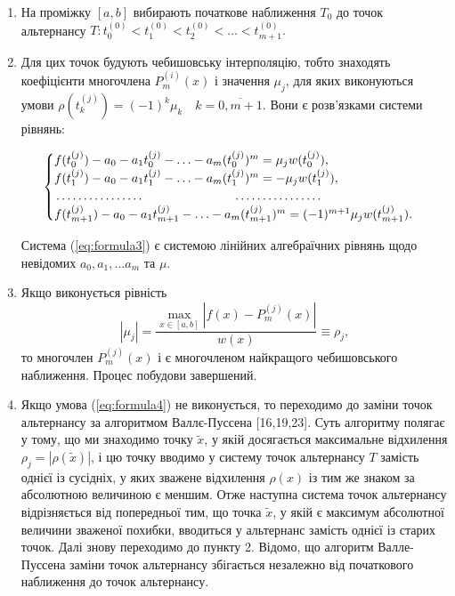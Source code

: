 \documentclass[ukrainian,14pt]{extarticle}
\begin{document}
\begin{enumerate}

\item
    На проміжку $[a, b]$ вибирають початкове наближення $T_0$ до точок альтернансу $T: t^{(0)}_{0} < t^{(0)}_{1} < t^{(0)}_{2} < \ldots < t^{(0)}_{m+1}.$
\item
    Для цих точок будують чебишовську інтерполяцію, тобто знаходять коефіцієнти многочлена $P^{(i)}_m(x)$ і значення $\mu_j$, для яких виконуються умови  $\rho(t^{(j)}_k) = (-1)^{k} \mu_k \quad k = \overline{0, m+1}$. Вони є розв'язками системи рівнянь:

\begin{equation}\label{eq:formula3}
\begin{cases}
f(t^{(j)}_0) - a_0 - a_1t^{(j)}_0 - \ldots - a_m(t_0^{(j)})^m=\mu_jw(t_0^{(j)}), \\
f(t^{(j)}_1)-a_0-a_1t^{(j)}_1 - \ldots - a_m(t^{(j)}_1)^m = - \mu_jw(t^{(j)}_1),\\
\dotfill\hfill\hbox{} \dotfill\hfill\hbox{}\\
f(t^{(j)}_{m+1}) -a_0 -a_1t^{(j)}_{m+1} - \ldots - a_m(t^{(j)}_{m+1})^m = (-1)^{m+1}\mu_jw(t^{(j)}_{m+1}).
\end{cases}
\end{equation}

Система (\ref{eq:formula3}) є системою   лінійних алгебраїчних рівнянь щодо невідомих $a_0, a_1, \ldots a_m$ та $\mu$.

\item
    Якщо виконується рівність
    \begin{equation}\label{eq:formula4}
        |\mu_j| = \frac{\max_{x \in [a,b]} |f(x) - P^{(j)}_m(x)|}{w(x)} \equiv \rho_j,
        \end{equation}
    то многочлен  $P^{(j)}_m(x)$ і є многочленом найкращого чебишовського наближення. Процес побудови завершений.
\item
    Якщо умова (\ref{eq:formula4}) не виконується, то переходимо до заміни точок альтернансу за алгоритмом Валлє-Пуссена [16,19,23]. Суть алгоритму полягає у тому, що ми знаходимо точку $\tilde{x}$, у якій досягається максимальне відхилення $\rho_j = |\rho(\tilde{x})|$, і цю точку   вводимо у систему точок альтернансу $T$ замість однієї із сусідніх, у яких зважене відхилення $\rho(x)$ із тим же знаком за абсолютною величиною є меншим. Отже наступна система точок альтернансу відрізняється від попередньої тим, що точка $\tilde{x}$, у якій є максимум абсолютної величини зваженої похибки, вводиться у альтернанс замість однієї із старих точок. Далі знову переходимо до пункту 2. Відомо, що алгоритм Валле-Пуссена заміни точок альтернансу збігається незалежно від початкового наближення до точок альтернансу. 

\end{enumerate}
\end{document}
